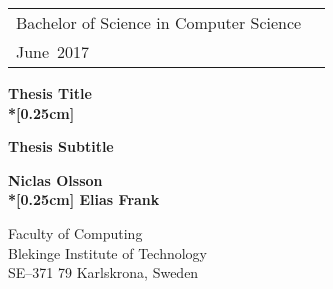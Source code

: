 \documentclass[a4paper,oneside]{bth}
\begin{document}
\pagestyle{plain}


\newcommand{\thesisMonth}{June}
\newcommand{\thesisYear}{2017}

\newcommand{\thesisDegree}{Bachelor of Science in Computer Science}

\newcommand{\thesisWeeks}{10}


{\pagestyle{empty}
\changepage{5cm}{1cm}{-0.5cm}{-0.5cm}{}{-2cm}{}{}{}
\noindent
\begin{tabular}{@{}p{} p{}}
\thesisDegree & \hfill\multirow{3}{*}{\bthcsnotextlogo{3cm}} \\
\thesisMonth \ \thesisYear & \\
\end{tabular}

\begin{center}

\vspace {7.5cm}

{\Huge\textbf{Thesis Title\\*[0.25cm]}}

\vspace {0.5cm}

{\Large\textbf{Thesis Subtitle}}

\vspace {3cm}

{\Large\textbf{Niclas Olsson \\*[0.25cm] Elias Frank}} %

\end{center}

\vspace*{\fill}

\noindent%
{\small 
Faculty of Computing \\
Blekinge Institute of Technology \\
SE--371 79 Karlskrona, Sweden
}

\clearpage
} %
\end{document}

